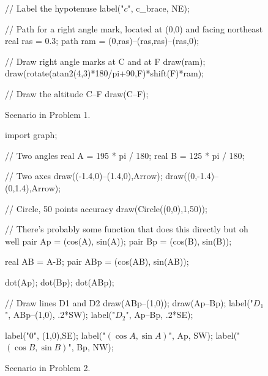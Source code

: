 \documentclass[../textbook.tex]{subfiles}
\begin{document}
\begin{figure}[h]
\begin{center}
\begin{minipage}[b]{0.45\textwidth}
\begin{asy}[width=0.7\textwidth]
				// Label the hypotenuse
				label("$c$", c_brace, NE);

				// Path for a right angle mark, located at (0,0) and facing northeast
				real ras = 0.3;
				path ram = (0,ras)--(ras,ras)--(ras,0);

				// Draw right angle marks at C and at F
				draw(ram);
				draw(rotate(atan2(4,3)*180/pi+90,F)*shift(F)*ram);

				// Draw the altitude C--F
				draw(C--F);
			\end{asy}
		\end{minipage}
	\end{center}
	\vspace*{-2\baselineskip}
	\begin{center}
		\begin{minipage}[t]{0.45\textwidth}
			\caption{Scenario in Problem 1.}
			\label{fig:square_inscribed}
		\end{minipage}
		\hfill
		\begin{minipage}[t]{0.45\textwidth}
			\caption{Scenario in Problem 2.}
			\label{fig:pythag_sim_tri}
		\end{minipage}
	\end{center}

	\begin{center}
		\begin{minipage}[b]{\textwidth}
			\centering
			\begin{asy}[width=0.5\textwidth]
				import graph;

				// Two angles
				real A = 195 * pi / 180;
				real B = 125 * pi / 180;

				// Two axes
				draw((-1.4,0)--(1.4,0),Arrow);
				draw((0,-1.4)--(0,1.4),Arrow);

				// Circle, 50 points accuracy
				draw(Circle((0,0),1,50));

				// There's probably some function that does this directly but oh well
				pair Ap = (cos(A), sin(A));
				pair Bp = (cos(B), sin(B));

				real AB = A-B;
				pair ABp = (cos(AB), sin(AB));

				dot(Ap);
				dot(Bp);
				dot(ABp);

				// Draw lines D1 and D2
				draw(ABp--(1,0));
				draw(Ap--Bp);
				label("$D_1$", ABp--(1,0), .2*SW);
			  label("$D_2$", Ap--Bp, .2*SE);

				label("$0$", (1,0),SE);
				label("$(\cos A, \sin A)$", Ap, SW);
				label("$(\cos B, \sin B)$", Bp, NW);


\end{asy}
\end{minipage}
\end{center}
\end{figure}
\end{document}
